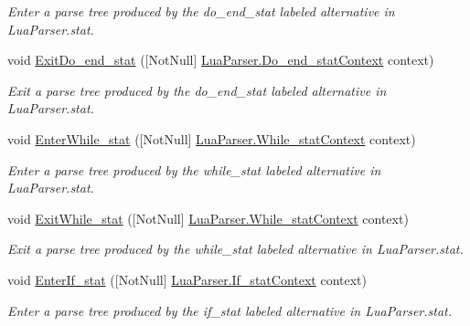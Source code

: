 \begin{DoxyCompactItemize}
\begin{DoxyCompactList}\small\item\em Enter a parse tree produced by the {\ttfamily do\+\_\+end\+\_\+stat} labeled alternative in Lua\+Parser.\+stat. \end{DoxyCompactList}\item 
void \mbox{\hyperlink{interfacezlua_1_1_i_lua_listener_a21222197a86ad5c425dcab38204a7840}{Exit\+Do\+\_\+end\+\_\+stat}} (\mbox{[}Not\+Null\mbox{]} \mbox{\hyperlink{classzlua_1_1_lua_parser_1_1_do__end__stat_context}{Lua\+Parser.\+Do\+\_\+end\+\_\+stat\+Context}} context)
\begin{DoxyCompactList}\small\item\em Exit a parse tree produced by the {\ttfamily do\+\_\+end\+\_\+stat} labeled alternative in Lua\+Parser.\+stat. \end{DoxyCompactList}\item 
void \mbox{\hyperlink{interfacezlua_1_1_i_lua_listener_abc1fb6386fa985aa88c2813bc1040876}{Enter\+While\+\_\+stat}} (\mbox{[}Not\+Null\mbox{]} \mbox{\hyperlink{classzlua_1_1_lua_parser_1_1_while__stat_context}{Lua\+Parser.\+While\+\_\+stat\+Context}} context)
\begin{DoxyCompactList}\small\item\em Enter a parse tree produced by the {\ttfamily while\+\_\+stat} labeled alternative in Lua\+Parser.\+stat. \end{DoxyCompactList}\item 
void \mbox{\hyperlink{interfacezlua_1_1_i_lua_listener_ab7cdf0dd588b664e1f8efbca0a03884e}{Exit\+While\+\_\+stat}} (\mbox{[}Not\+Null\mbox{]} \mbox{\hyperlink{classzlua_1_1_lua_parser_1_1_while__stat_context}{Lua\+Parser.\+While\+\_\+stat\+Context}} context)
\begin{DoxyCompactList}\small\item\em Exit a parse tree produced by the {\ttfamily while\+\_\+stat} labeled alternative in Lua\+Parser.\+stat. \end{DoxyCompactList}\item 
void \mbox{\hyperlink{interfacezlua_1_1_i_lua_listener_ae4466707d78b9bb5f5836ed8710e4ef1}{Enter\+If\+\_\+stat}} (\mbox{[}Not\+Null\mbox{]} \mbox{\hyperlink{classzlua_1_1_lua_parser_1_1_if__stat_context}{Lua\+Parser.\+If\+\_\+stat\+Context}} context)
\begin{DoxyCompactList}\small\item\em Enter a parse tree produced by the {\ttfamily if\+\_\+stat} labeled alternative in Lua\+Parser.\+stat. \end{DoxyCompactList}\item 

\end{DoxyCompactItemize}
